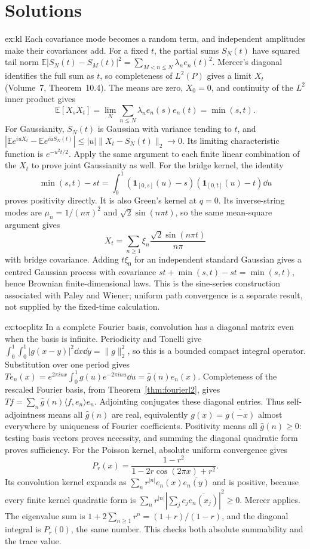 \section{Solutions}

\begin{solution}{ex:kl}
\idea Each covariance mode becomes a random term, and independent amplitudes make their covariances add.
\writeup For a fixed $t$, the partial sums $S_N(t)$ have squared tail norm
$\mathbb E|S_N(t)-S_M(t)|^2=\sum_{M<n\le N}\lambda_ne_n(t)^2$.
Mercer's diagonal identifies the full sum as $t$, so completeness of $L^2(P)$ gives a limit $X_t$ (Volume~7, Theorem~10.4). The means are zero, $X_0=0$, and continuity of the $L^2$ inner product gives
\[
\mathbb E[X_sX_t]=\lim_N\sum_{n\le N}\lambda_ne_n(s)e_n(t)=\min(s,t).
\]
For Gaussianity, $S_N(t)$ is Gaussian with variance tending to $t$, and
$|\mathbb E e^{iuX_t}-\mathbb E e^{iuS_N(t)}|\le|u|\|X_t-S_N(t)\|_2\to0$.
Its limiting characteristic function is $e^{-u^2t/2}$. Apply the same argument to each finite linear combination of the $X_t$ to prove joint Gaussianity as well.
For the bridge kernel, the identity
\[
\min(s,t)-st=\int_0^1(\mathbf1_{[0,s]}(u)-s)
(\mathbf1_{[0,t]}(u)-t)\dd u
\]
proves positivity directly. It is also Green's kernel at $q=0$. Its inverse-string modes are $\mu_n=1/(n\pi)^2$ and $\sqrt2\sin(n\pi t)$, so the same mean-square argument gives
\[
X_t=\sum_{n\ge1}\xi_n\frac{\sqrt2\sin(n\pi t)}{n\pi}
\]
with bridge covariance. Adding $t\xi_0$ for an independent standard Gaussian gives a centred Gaussian process with covariance $st+\min(s,t)-st=\min(s,t)$, hence Brownian finite-dimensional laws. This is the sine-series construction associated with Paley and Wiener; uniform path convergence is a separate result, not supplied by the fixed-time calculation.
\end{solution}

\begin{solution}{ex:toeplitz}
\idea In a complete Fourier basis, convolution has a diagonal matrix even when the basis is infinite.
\writeup Periodicity and Tonelli give $\int_0^1\int_0^1|g(x-y)|^2\dd x\dd y=\|g\|_2^2$, so this is a bounded compact integral operator. Substitution over one period gives $Te_n(x)=e^{2\pi inx}\int_0^1g(u)e^{-2\pi inu}\dd u=\hat g(n)e_n(x)$.
Completeness of the rescaled Fourier basis, from Theorem~\ref{thm:fourierl2}, gives $Tf=\sum_n\hat g(n)\langle f,e_n\rangle e_n$. Adjointing conjugates these diagonal entries. Thus self-adjointness means all $\hat g(n)$ are real, equivalently $g(x)=\overline{g(-x)}$ almost everywhere by uniqueness of Fourier coefficients. Positivity means all $\hat g(n)\ge0$: testing basis vectors proves necessity, and summing the diagonal quadratic form proves sufficiency.
For the Poisson kernel, absolute uniform convergence gives
\[
P_r(x)=\frac{1-r^2}{1-2r\cos(2\pi x)+r^2}.
\]
Its convolution kernel expands as $\sum_nr^{|n|}e_n(x)\overline{e_n(y)}$ and is positive, because every finite kernel quadratic form is $\sum_nr^{|n|}|\sum_jc_j\overline{e_n(x_j)}|^2\ge0$. Mercer applies. The eigenvalue sum is $1+2\sum_{n\ge1}r^n=(1+r)/(1-r)$, and the diagonal integral is $P_r(0)$, the same number. This checks both absolute summability and the trace value.
\end{solution}

